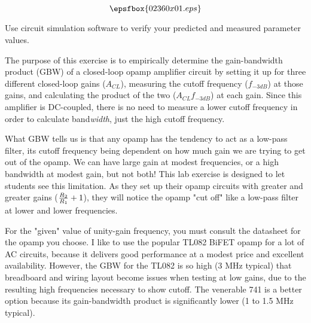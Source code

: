 

$$\epsfbox{02360x01.eps}$$

\vfil \eject






Use circuit simulation software to verify your predicted and measured parameter values.







The purpose of this exercise is to empirically determine the gain-bandwidth product (GBW) of a closed-loop opamp amplifier circuit by setting it up for three different closed-loop gains ($A_{CL}$), measuring the cutoff frequency ($f_{-3dB}$) at those gains, and calculating the product of the two ($A_{CL} f_{-3dB}$) at each gain.  Since this amplifier is DC-coupled, there is no need to measure a lower cutoff frequency in order to calculate band{\it width}, just the high cutoff frequency.

What GBW tells us is that any opamp has the tendency to act as a low-pass filter, its cutoff frequency being dependent on how much gain we are trying to get out of the opamp.  We can have large gain at modest frequencies, or a high bandwidth at modest gain, but not both!  This lab exercise is designed to let students see this limitation.  As they set up their opamp circuits with greater and greater gains (${R_2 \over R_1} + 1$), they will notice the opamp "cut off" like a low-pass filter at lower and lower frequencies. 

For the "given" value of unity-gain frequency, you must consult the datasheet for the opamp you choose.  I like to use the popular TL082 BiFET opamp for a lot of AC circuits, because it delivers good performance at a modest price and excellent availability.  However, the GBW for the TL082 is so high (3 MHz typical) that breadboard and wiring layout become issues when testing at low gains, due to the resulting high frequencies necessary to show cutoff.  The venerable 741 is a better option because its gain-bandwidth product is significantly lower (1 to 1.5 MHz typical).

